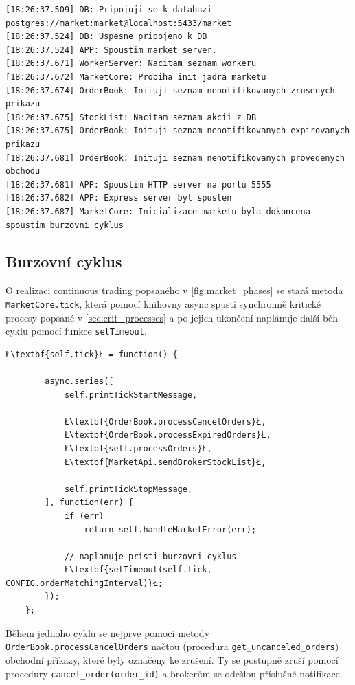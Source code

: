 \documentclass[thesis=M,czech]{FITthesis}[2012/06/26]
\begin{document}
\begin{lstlisting}[basicstyle={\tiny\ttfamily}, frame=single] 
[18:26:37.509] DB: Pripojuji se k databazi postgres://market:market@localhost:5433/market
[18:26:37.524] DB: Uspesne pripojeno k DB 
[18:26:37.524] APP: Spoustim market server. 
[18:26:37.671] WorkerServer: Nacitam seznam workeru 
[18:26:37.672] MarketCore: Probiha init jadra marketu 
[18:26:37.674] OrderBook: Inituji seznam nenotifikovanych zrusenych prikazu 
[18:26:37.675] StockList: Nacitam seznam akcii z DB 
[18:26:37.675] OrderBook: Inituji seznam nenotifikovanych expirovanych prikazu 
[18:26:37.681] OrderBook: Inituji seznam nenotifikovanych provedenych obchodu 
[18:26:37.681] APP: Spoustim HTTP server na portu 5555 
[18:26:37.682] APP: Express server byl spusten 
[18:26:37.687] MarketCore: Inicializace marketu byla dokoncena - spoustim burzovni cyklus 
\end{lstlisting}


\subsection{Burzovní cyklus}
	
	O realizaci continuous trading popsaného v \ref{fig:market_phases} se stará metoda \texttt{MarketCore.tick}, která pomocí knihovny async spustí synchronně kritické procesy popsané v \ref{sec:crit_processes} a po jejich ukončení naplánuje další běh cyklu pomocí funkce \texttt{setTimeout}. 

\begin{lstlisting}[basicstyle={\tiny\ttfamily}, frame=single] 
    Ł\textbf{self.tick}Ł = function() {

        async.series([
            self.printTickStartMessage,

            Ł\textbf{OrderBook.processCancelOrders}Ł,
            Ł\textbf{OrderBook.processExpiredOrders}Ł,
            Ł\textbf{self.processOrders}Ł,
            Ł\textbf{MarketApi.sendBrokerStockList}Ł,
            
            self.printTickStopMessage,
        ], function(err) {
            if (err)
                return self.handleMarketError(err);

            // naplanuje pristi burzovni cyklus
            Ł\textbf{setTimeout(self.tick, CONFIG.orderMatchingInterval)}Ł;
        });
    };
\end{lstlisting}

	Během jednoho cyklu se nejprve pomocí metody \texttt{OrderBook.processCancelOrders} načtou (procedura \texttt{get\_uncanceled\_orders}) obchodní příkazy, které byly označeny ke zrušení. Ty se postupně zruší pomocí procedury \texttt{cancel\_order(order\_id)} a brokerům se odešlou příslušné notifikace.
	
\end{document}
